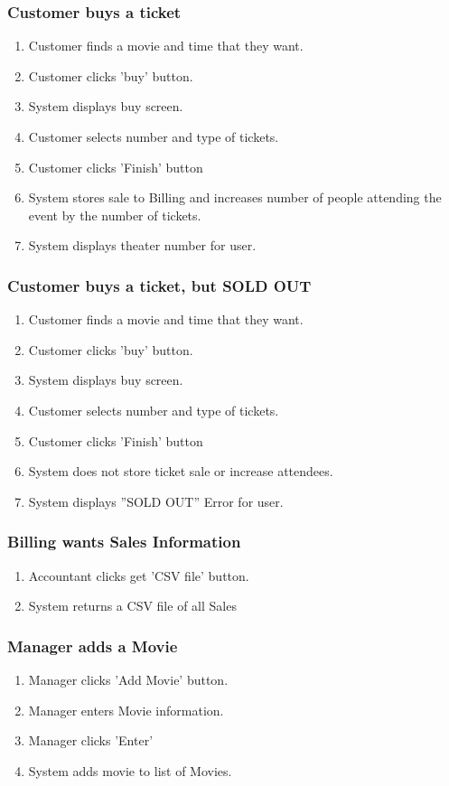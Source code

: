 \documentclass[12pt,titlepage,letterpaper]{article}
\begin{document}
\subsubsection{Customer buys a ticket}
\begin{enumerate}
 	\item Customer finds a movie and time that they want.
 	\item Customer clicks 'buy' button.
 	\item System displays buy screen.
 	\item Customer selects number and type of tickets.
 	\item Customer clicks 'Finish' button
 	\item System stores sale to Billing and increases number of people attending the event by the number of tickets.
 	\item System displays theater number for user.
\end{enumerate}

\subsubsection{Customer buys a ticket, but SOLD OUT}
\begin{enumerate}
 	\item Customer finds a movie and time that they want.
 	\item Customer clicks 'buy' button.
 	\item System displays buy screen.
 	\item Customer selects number and type of tickets.
 	\item Customer clicks 'Finish' button
 	\item System does not store ticket sale or increase attendees.
 	\item System displays ''SOLD OUT'' Error for user.
\end{enumerate}

\subsubsection{Billing wants Sales Information}
\begin{enumerate}
 	\item Accountant clicks get 'CSV file' button.
 	\item System returns a CSV file of all Sales
\end{enumerate}

\subsubsection{Manager adds a Movie}
\begin{enumerate}
 	\item Manager clicks 'Add Movie' button.
 	\item Manager enters Movie information.
 	\item Manager clicks 'Enter'
 	\item System adds movie to list of Movies.
\end{enumerate}
\end{document}

